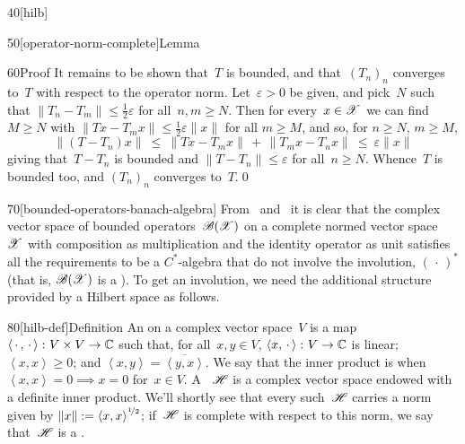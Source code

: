 \begin{parsec}{40}[hilb]
\begin{point}{50}[operator-norm-complete]{Lemma}
\begin{point}{60}{Proof}
It remains to be shown that~$T$ is bounded,
and that~$(T_n)_n$ converges to~$T$ with respect to the operator norm.
Let~$\varepsilon>0$ be given, and pick~$N$ such that
$\|T_n-T_m\|\leq \frac{1}{2}\varepsilon$ for all~$n,m\geq N$.
Then for every~$x\in \mathscr{X}$
we can find~$M\geq N$ with 
$\|T x - T_m x\|\leq \frac{1}{2}\varepsilon\|x\|$ for all $m\geq M$,
and so,
for $n\geq N$, $m\geq M$,
\begin{equation*}
\|(T - T_n) x\| \ \leq\ \|T x - T_mx\|\,+\,\|T_m x - T_n x\|
\ \leq\  \varepsilon\|x\|
\end{equation*}
giving that~$T-T_n$ is bounded
and $\|T-T_n\|\leq \varepsilon$ for all~$n\geq N$.
Whence~$T$ is bounded too,
and $(T_n)_n$ converges to~$T$.\qed
\end{point}
\end{point}
\begin{point}{70}[bounded-operators-banach-algebra]%
From~
and~
it is clear that the complex vector space
of bounded operators~$\mathscr{B}(\mathscr{X})$
on a complete normed vector space~$\mathscr{X}$
with composition as multiplication
and the identity operator as unit
satisfies all the requirements
to be a $C^*$-algebra that do not involve the involution, $(\,\cdot\,)^*$
(that is, $\mathscr{B}(\mathscr{X})$ is a ).
To get an involution,
we need the additional structure
provided by a Hilbert space as follows.
\end{point}
\begin{point}{80}[hilb-def]{Definition}%
An %
on a complex vector space~$V$ 
is a map $\left<\,\cdot\,,\,\cdot\,\right>\colon V\times V\to \mathbb{C}$%
such that,
for all~$x,y\in V$,
$\left<x,\,\cdot\,\right>\colon V\to \mathbb{C}$ is linear;
$\left<x,x\right>\geq 0$;
and
$\left<x,y\right>=\overline{\left<y,x\right>}$.
We say that the inner product is %
when~$\left<x,x\right>=0\implies x=0$ for~$x\in V$.
A ~$\mathscr{H}$%
is a complex vector space endowed with a definite inner product.
We'll shortly see that every such~$\mathscr{H}$
carries a norm
given by
 $\|x\|:= \left<x,x\right>^{\nicefrac{1}{2}}$;
if~$\mathscr{H}$ is complete with respect to this norm,
we say that~$\mathscr{H}$ is a .%


\end{point}
\end{parsec}
